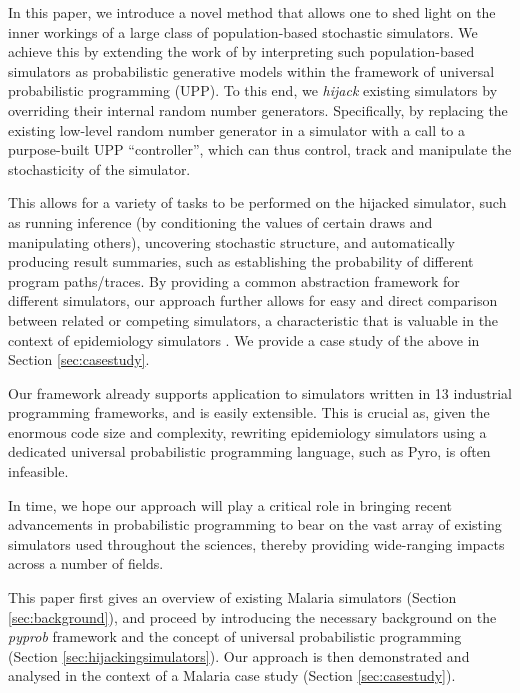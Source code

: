 \documentclass{article}
\begin{document}
In this paper, we introduce a novel method that allows one to shed light on the inner workings of a large class of population-based stochastic simulators. We achieve this by extending the work of \citep{baydin2018efficient} by interpreting such population-based simulators as probabilistic generative models within the framework of universal probabilistic programming (UPP)\cite{le-2016-inference}. To this end, we \emph{hijack} existing simulators by overriding their internal random number generators.  Specifically, by replacing the existing low-level random number generator in a simulator with a call to a purpose-built UPP ``controller'', which can thus control, track and manipulate the stochasticity of the simulator.

This allows for a variety of tasks to be performed on
the hijacked simulator, such as running inference (by conditioning
the values of certain draws and manipulating others),
uncovering stochastic structure, and automatically
producing result summaries, such as establishing the probability
of different program paths/traces.  By providing a common abstraction 
framework for different simulators, our approach further allows for
easy and direct comparison between related or competing
simulators, a characteristic that is valuable in the context of
epidemiology simulators \cite{ferris_openmalaria_2015}. We provide a case study of the above in Section \ref{sec:casestudy}.

Our framework already supports application to simulators written in 13 industrial programming frameworks, and is easily extensible. This is crucial as, given the enormous code size and complexity, rewriting epidemiology simulators using a dedicated universal probabilistic programming language, such as Pyro\cite{bingham2019pyro}, is often infeasible.

In time, we hope our approach will play a critical role in
bringing recent advancements in probabilistic programming to bear on
the vast array of existing simulators used throughout the sciences,
thereby providing wide-ranging impacts across a number of fields.

This paper first gives an overview of existing Malaria simulators (Section \ref{sec:background}), and proceed by introducing the necessary background on the \textit{pyprob} framework and the concept of universal probabilistic programming (Section \ref{sec:hijackingsimulators}). Our approach is then demonstrated and analysed in the context of a Malaria case study (Section \ref{sec:casestudy}). 
\end{document}
